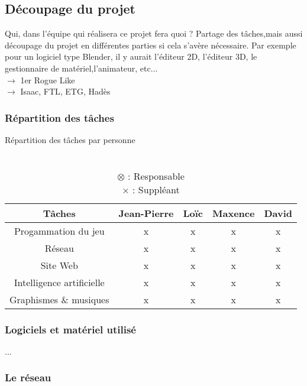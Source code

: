 \documentclass{article}
\begin{document}
\subsection{Découpage du projet}

Qui, dans l’équipe qui réalisera ce projet fera quoi ? Partage des tâches,mais aussi découpage du projet en différentes parties si cela s’avère nécessaire. Par exemple pour un logiciel type Blender, il y aurait l’éditeur 2D, l’éditeur 3D, le gestionnaire de matériel,l’animateur, etc... \\
$\rightarrow$ 1er Rogue Like \\
$\rightarrow$ Isaac, FTL, ETG, Hadès

\pagebreak

\subsubsection{Répartition des tâches}

\begin{table}[h!]
    \centering
    \caption*{Répartition des tâches par personne}
    \begin{tabular}{ |c|c|c|c|c| } %
        \hline
        Tâches & Jean-Pierre & Loïc & Maxence & David \\
        \hline
        Progammation du jeu & x & x & x & x \\
        \hline
        Réseau & x & x & x & x \\
        \hline
        Site Web & x & x & x & x \\
        \hline
        Intelligence artificielle & x & x & x & x \\
        \hline
        Graphismes \& musiques & x & x & x & x \\
        \hline
    \end{tabular}
    \caption*{
        \\ $\otimes$ : Responsable
        \\ $\times$ : Suppléant
    }
    \label{table:repartition}
\end{table}


\subsubsection{Logiciels et matériel utilisé}

...

\subsubsection{Le réseau}
\end{document}
